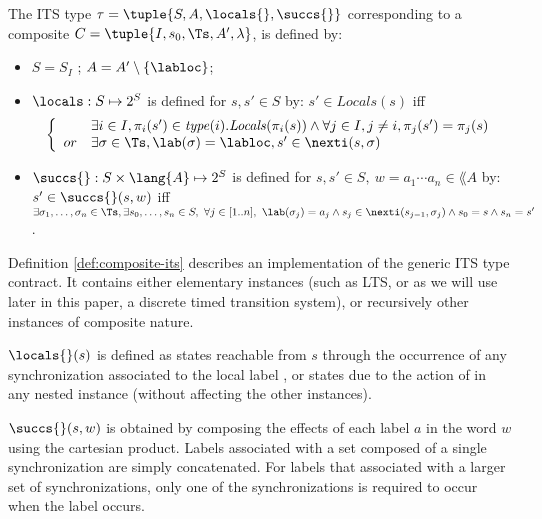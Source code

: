\begin{definition}
\label{def:composite-its}
The ITS type
$\tau = \tuple{S,A,\locals{},\succs{}}$
corresponding to a composite $C=\tuple{I, s_0, \Ts, A', \lambda}$, is defined by:
\begin{itemize}
\item $S = S_I$ ;
$A = A' \setminus \{ \labloc \}$;
\item $\locals: S \mapsto 2^S$ is defined for $s,s' \in S$ by: $s' \in \mathit{Locals}(s)$ iff
$$
\left\{
\begin{array}{cl}
 & \exists i \in I, \pi_i (s') \in \mathit{type}(i).\mathit{Locals}( \pi_i(s)) \land \forall j \in I, j \neq i, \pi_j(s') = \pi_j(s)  \\
or & \exists \sigma \in \Ts, \lab(\sigma) = \labloc, s' \in \nexti(s,\sigma)
\end{array}
\right.
$$

\item $\succs{}: S \times \lang{A} \mapsto 2^S$ is defined for $s,s'
  \in S, \ w=a_1\cdots a_n \in \lang{A}$ by:
  $s' \in \succs{}(s,w)$ iff \\
  $\exists \sigma_1,\ldots,\sigma_n \in \Ts, \exists s_0,\ldots,s_n
  \in S, \ \forall j \in [1..n], \ \lab(\sigma_j) = a_j \land s_j
  \in \nexti(s_{j-1},\sigma_j) \land s_0=s \land s_n=s'$.

\end{itemize}
\end{definition}

Definition \ref{def:composite-its} describes an implementation of the
generic ITS type contract. It contains either elementary instances
(such as LTS, or as we will use later in this paper, a discrete timed
transition system), or recursively other instances of composite
nature.

$\locals{}(s)$ is defined as states reachable from $s$ through the
occurrence of any synchronization associated to the local label
\labloc, or states due to the action of \locals{} in any nested
instance (without affecting the other instances).

$\succs{}(s,w)$ is obtained by composing the effects of each label $a$
in the word $w$ using the cartesian product. Labels associated with a
set composed of a single synchronization are simply concatenated. For
labels that associated with a larger set of synchronizations, only one
of the synchronizations is required to occur when the label occurs.

